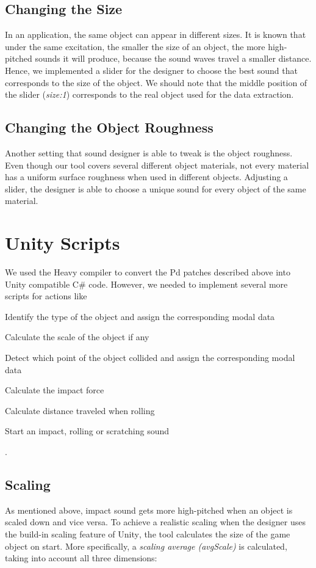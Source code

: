 \subsection{Changing the Size}
In an application, the same object can appear in different sizes. It is known that under the same excitation, the smaller the size of an object, the more high-pitched sounds it will produce, because the sound waves travel a smaller distance. Hence, we implemented a slider for the designer to choose the best sound that corresponds to the size of the object. We should note that the middle position of the slider (\textit{size:1}) corresponds to the real object used for the data extraction.

\subsection{Changing the Object Roughness}
Another setting that sound designer is able to tweak is the object roughness. Even though our tool covers several different object materials, not every material has a uniform surface roughness when used in different objects. Adjusting a slider, the designer is able to choose a unique sound for every object of the same material. 


\section{Unity\textsuperscript{\textregistered} Scripts}
We used the Heavy \cite{bib:heavy} compiler to convert the Pd patches described above into Unity\textsuperscript{\textregistered} compatible C\# code. However, we needed to implement several more scripts for actions like 
\begin{inparaenum}[1)]
\item Identify the type of the object and assign the corresponding modal data
\item Calculate the scale of the object if any
\item Detect which point of the object collided and assign the corresponding modal data
\item Calculate the impact force
\item Calculate distance traveled when rolling
\item Start an impact, rolling or scratching sound 
\end{inparaenum}.   

\subsection{Scaling}
As mentioned above, impact sound gets more high-pitched when an object is scaled down and vice versa. To achieve a realistic scaling when the designer uses the build-in scaling feature of Unity\textsuperscript{\textregistered}, the tool calculates the size of the game object on start. More specifically, a \textit{scaling average (avgScale)} is calculated, taking into account all three dimensions:

